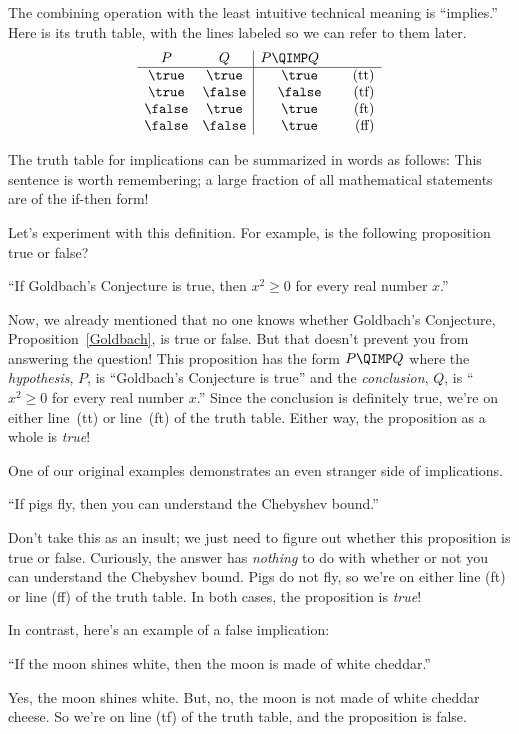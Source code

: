 The combining operation with the least intuitive technical meaning is
``implies.''  Here is its truth table, with the lines labeled so we can
refer to them later.
%
\[
\begin{array}{cc|cr}
    P  &   Q    & \parbox[b]{13ex}{$P \QIMP Q$} \\ \hline
\true  & \true  & \true & \text{(tt)}\\
\true  & \false & \false  & \text{(tf)}\\
\false & \true  & \true  & \text{(ft)}\\
\false & \false & \true  & \text{(ff)}
\end{array}
\]

The truth table for implications can be summarized in words as
follows:
This sentence is worth remembering; a large fraction of all
mathematical statements are of the if-then form!

Let's experiment with this definition.  For example, is the following
proposition true or false?
\begin{center}
``If Goldbach's Conjecture is true, then $x^2 \geq 0$ for every real
number $x$.''
\end{center}
Now, we already mentioned that no one knows whether Goldbach's Conjecture,
Proposition~\ref{Goldbach}, is true or false.  But that doesn't prevent
you from answering the question!  This proposition has the form $P
\QIMP Q$ where the \emph{hypothesis}, $P$, is ``Goldbach's Conjecture
is true'' and the \emph{conclusion}, $Q$, is ``$x^2 \geq 0$ for every real
number $x$.''  Since the conclusion is definitely true, we're on either
line~(tt) or line~(ft) of the truth table.  Either way, the proposition as
a whole is \textit{true}!

One of our original examples demonstrates an even stranger side of
implications.
\begin{center}
``If pigs fly, then you can understand the Chebyshev bound.''
\end{center}
Don't take this as an insult; we just need to figure out whether this
proposition is true or false.  Curiously, the answer has \textit{nothing}
to do with whether or not you can understand the Chebyshev bound.  Pigs do
not fly, so we're on either line (ft) or line (ff) of the truth table.  In
both cases, the proposition is \textit{true}!

In contrast, here's an example of a false implication:
\begin{center}
``If the moon shines white, then the moon is made of white cheddar.''
\end{center}
Yes, the moon shines white.  But, no, the moon is not made of white
cheddar cheese.  So we're on line (tf) of the truth table, and the
proposition is false.

